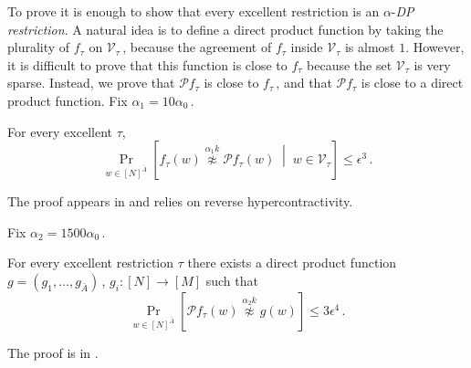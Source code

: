 \documentclass{toc}
\newcommand{\Prob}[2][]{\Pr_{{#1}}\left[#2\right]} %
\newcommand{\brac}[1]{[#1]} %
\newcommand{\given}{\;\middle\vert\;} %
\newcommand\f{f} %
\newcommand{\g}{g} %
\newcommand\bh{\mathcal{P}\f_\tau} %
\newcommand\neqg[1]{\stackrel{{#1}}{ \not\approx}} %
\newcommand\cons{\mathcal{V}} %
\newcommand\rest[1]{{\bar{#1}}}  %
\begin{document}
To prove  it is enough to show that every excellent restriction is an $\alpha$-\emph{DP restriction}. A natural idea is to define a direct product function by taking the plurality of $f_\tau$ on $\cons_\tau$\,, because the agreement of $f_\tau$ inside $\cons_\tau$ is almost $1$. However, it is difficult to prove that this function is close to $f_\tau$ because the set $\cons_\tau$ is very sparse. Instead, we prove that $\bh$ is close to $\f_\tau$\,, and that $\bh$ is close to a direct product function. Fix $\alpha_1 = 10\alpha_0$\,.

\begin{lemma}\label{lem:local avg eq local}
	For every excellent $\tau$,
	\[\Prob[w\in\brac{N}^{\bar{A}}]{\f_{\tau}(w) \neqg{ \alpha_1 k} \bh(w)\given w\in\cons_\tau}\leq \epsilon^3\,.\]  %
\end{lemma} 
The proof appears in  and relies on reverse hypercontractivity. 

Fix $\alpha_2 = 1500\alpha_0$\,.
\begin{lemma}\label{lem:local avg product}
	For every excellent restriction $\tau$ there exists a direct product function $\g = (\g_1,\ldots, \g_{\rest{A}})$\,, $\g_i:[N]\rightarrow[M]$ such that
	\[\Prob[w\in\brac{N}^{\bar{A}}]{\bh(w)\neqg{\alpha_2 k}\g(w) }\leq 3\epsilon^{4}\,.\]  %
\end{lemma}
The proof is in .
	
\end{document}
